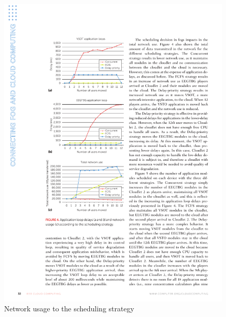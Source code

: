 \documentclass[10pt, pdf, xcolor=pdftex, dvipsnames, table]{beamer}
\begin{document}
\begin{frame}
 	\begin{figure}[htbp]
 		\centerline{\includegraphics[scale=1.2]{images/4c.pdf}}
 		\caption[Network usage according to the scheduling strategy]{Network usage to the scheduling strategy}
 	\end{figure}
\end{frame}
\end{document}
